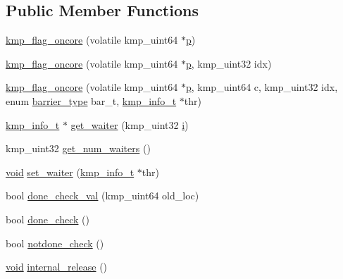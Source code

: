 \subsection*{Public Member Functions}
\begin{DoxyCompactItemize}
\item 
\hyperlink{classkmp__flag__oncore_acf5a14713e98b0422f4f95c8e583f878}{kmp\-\_\-flag\-\_\-oncore} (volatile kmp\-\_\-uint64 $\ast$\hyperlink{ittnotify__static_8h_ab7caea589d3ca96f9f11c78f10bff578}{p})
\item 
\hyperlink{classkmp__flag__oncore_ad9c8add8082423d2f0ffd92935884bfe}{kmp\-\_\-flag\-\_\-oncore} (volatile kmp\-\_\-uint64 $\ast$\hyperlink{ittnotify__static_8h_ab7caea589d3ca96f9f11c78f10bff578}{p}, kmp\-\_\-uint32 idx)
\item 
\hyperlink{classkmp__flag__oncore_ac81f19d6d4ec818b3e35dfff1749ca4b}{kmp\-\_\-flag\-\_\-oncore} (volatile kmp\-\_\-uint64 $\ast$\hyperlink{ittnotify__static_8h_ab7caea589d3ca96f9f11c78f10bff578}{p}, kmp\-\_\-uint64 c, kmp\-\_\-uint32 idx, enum \hyperlink{kmp_8h_ad0f7c21f2f1d446087ef5714eb0fd8cf}{barrier\-\_\-type} bar\-\_\-t, \hyperlink{kmp_8h_a194859801fe16b326efe34501a37c30a}{kmp\-\_\-info\-\_\-t} $\ast$thr)
\item 
\hyperlink{kmp_8h_a194859801fe16b326efe34501a37c30a}{kmp\-\_\-info\-\_\-t} $\ast$ \hyperlink{classkmp__flag__oncore_a41ad8584ed63b8ef81ade52c62871904}{get\-\_\-waiter} (kmp\-\_\-uint32 \hyperlink{kmp__stub_8c_a08582ce460e3d5e1cf0b7fea017d608e}{i})
\item 
kmp\-\_\-uint32 \hyperlink{classkmp__flag__oncore_a74f8cb0dc6652e84a5d69d722a9300f0}{get\-\_\-num\-\_\-waiters} ()
\item 
\hyperlink{ittnotify__static_8h_af941d56e55e3c5465135b60c4d6343ed}{void} \hyperlink{classkmp__flag__oncore_a42a8c8c893495f95e6493ac8530dc319}{set\-\_\-waiter} (\hyperlink{kmp_8h_a194859801fe16b326efe34501a37c30a}{kmp\-\_\-info\-\_\-t} $\ast$thr)
\item 
bool \hyperlink{classkmp__flag__oncore_a9d352ee08ce4f95e7f99549d2b53aaf0}{done\-\_\-check\-\_\-val} (kmp\-\_\-uint64 old\-\_\-loc)
\item 
bool \hyperlink{classkmp__flag__oncore_a5921b4cdaab532b350f3873323bcb021}{done\-\_\-check} ()
\item 
bool \hyperlink{classkmp__flag__oncore_a2f2481d90f9f4ca18d3a71ec9264b224}{notdone\-\_\-check} ()
\item 
\hyperlink{ittnotify__static_8h_af941d56e55e3c5465135b60c4d6343ed}{void} \hyperlink{classkmp__flag__oncore_a85cc9f5fbdc1d291dd2ec7893891a946}{internal\-\_\-release} ()

\end{DoxyCompactItemize}
